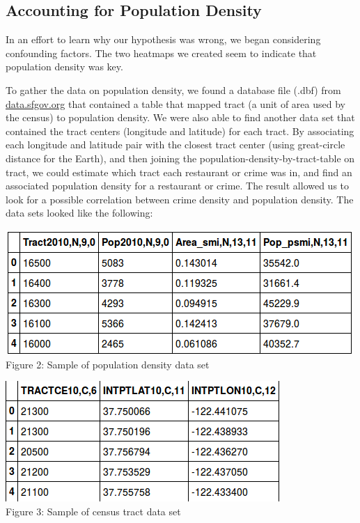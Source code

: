 \documentclass{article}
\begin{document}
\subsection{Accounting for Population Density}

In an effort to learn why our hypothesis was wrong, we began considering
confounding factors. The two heatmaps we created seem to indicate that
population density was key.

To gather the data on population density, we found a database file (.dbf)
from \url{data.sfgov.org} that contained a table that mapped tract (a unit
of area used by the census) to population density. We were also able to
find another data set that contained the tract centers (longitude and
latitude) for each tract. By associating each longitude and latitude pair
with the closest tract center (using great-circle distance for the Earth),
and then joining the population-density-by-tract-table on tract, we could
estimate which tract each restaurant or crime was in, and find an
associated population density for a restaurant or crime. The result allowed
us to look for a possible correlation between crime density and population
density. The data sets looked like the following:
\begin{center}
  \includegraphics[scale=0.7]{raw_popdensitydata.png} \\
  Figure 2: Sample of population density data set

  \includegraphics[scale=0.7]{tract_raw_data.png} \\
  Figure 3: Sample of census tract data set
\end{center}
\end{document}
